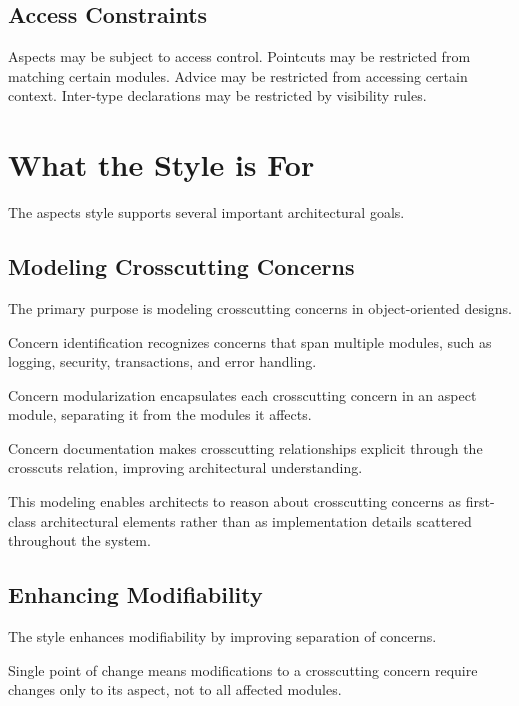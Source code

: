 \documentclass[11pt]{article}
\begin{document}
\subsection{Access Constraints}

Aspects may be subject to access control. Pointcuts may be restricted from matching certain modules. Advice may be restricted from accessing certain context. Inter-type declarations may be restricted by visibility rules.

\section{What the Style is For}

The aspects style supports several important architectural goals.

\subsection{Modeling Crosscutting Concerns}

The primary purpose is modeling crosscutting concerns in object-oriented designs.

Concern identification recognizes concerns that span multiple modules, such as logging, security, transactions, and error handling.

Concern modularization encapsulates each crosscutting concern in an aspect module, separating it from the modules it affects.

Concern documentation makes crosscutting relationships explicit through the crosscuts relation, improving architectural understanding.

This modeling enables architects to reason about crosscutting concerns as first-class architectural elements rather than as implementation details scattered throughout the system.

\subsection{Enhancing Modifiability}

The style enhances modifiability by improving separation of concerns.

Single point of change means modifications to a crosscutting concern require changes only to its aspect, not to all affected modules.
\end{document}
